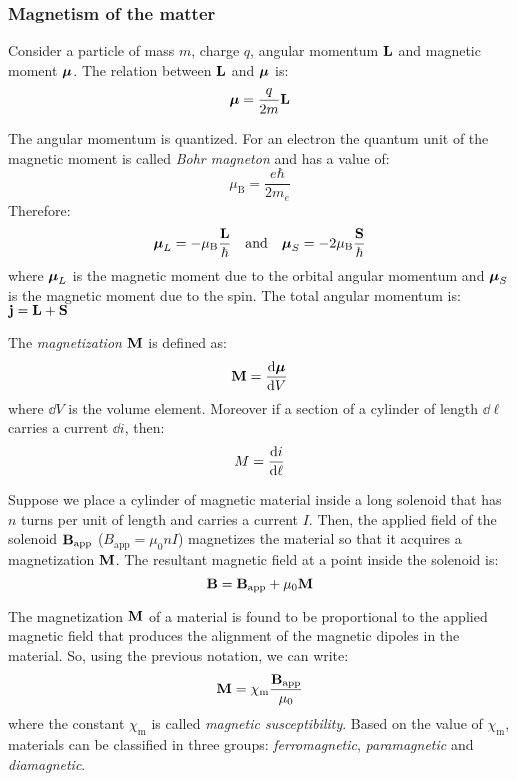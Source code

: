 \documentclass[../../../main.tex]{subfiles}
\begin{document}
\begin{multicols}{2}
  \subsubsection{Magnetism of the matter}
  \begin{prop}
    Consider a particle of mass $m$, charge $q$, angular momentum $\boldsymbol{\mathrm{L}}$ and magnetic moment $\vb*{\mu}$. The relation between $\boldsymbol{\mathrm{L}}$ and $\vb*{\mu}$ is: $$\vb*{\mu}=\frac{q}{2m}\boldsymbol{\mathrm{L}}$$
  \end{prop}
  \begin{prop}
    The angular momentum is quantized. For an electron the quantum unit of the magnetic moment is called \textit{Bohr magneton} and has a value of: $$\mu_\text{B}=\frac{e\hbar}{2m_e}$$ Therefore: $$\vb*{\mu}_L=-\mu_\text{B}\frac{\boldsymbol{\mathrm{L}}}{\hbar}\quad\text{and}\quad\vb*{\mu}_S=-2\mu_\text{B}\frac{\boldsymbol{\mathrm{S}}}{\hbar}$$ where $\vb*{\mu}_L$ is the magnetic moment due to the orbital angular momentum and $\vb*{\mu}_S$ is the magnetic moment due to the spin. The total angular momentum is: $\boldsymbol{\mathrm{j}}=\boldsymbol{\mathrm{L}}+\boldsymbol{\mathrm{S}}$
  \end{prop}
  \begin{definition}
    The \textit{magnetization $\boldsymbol{\mathrm{M}}$} is defined as: $$\boldsymbol{\mathrm{M}}=\dv{\vb*{\mu}}{V}$$ where $\dd V$ is the volume element. Moreover if a section of a cylinder of length $\dd\ell$ carries a current $\dd i$, then: $$M=\dv{i}{\ell}$$
  \end{definition}
  \begin{prop}
    Suppose we place a cylinder of magnetic material inside a long solenoid that has $n$ turns per unit of length and carries a current $I$. Then, the applied field of the solenoid $\boldsymbol{\mathrm{B}}_\text{app}$ ($B_\text{app}=\mu_0nI$) magnetizes the material so that it acquires a magnetization $\boldsymbol{\mathrm{M}}$. The resultant magnetic field at a point inside the solenoid is: $$\boldsymbol{\mathrm{B}}=\boldsymbol{\mathrm{B}}_\text{app}+\mu_0\boldsymbol{\mathrm{M}}$$
  \end{prop}
  \begin{prop}
    The magnetization $\boldsymbol{\mathrm{M}}$ of a material is found to be proportional to the applied magnetic field that produces the alignment of the magnetic dipoles in the material. So, using the previous notation, we can write: $$\boldsymbol{\mathrm{M}}=\chi_\text{m}\frac{\boldsymbol{\mathrm{B}}_\text{app}}{\mu_0}$$ where the constant $\chi_\text{m}$ is called \textit{magnetic susceptibility}. Based on the value of $\chi_\text{m}$, materials can be classified in three groups: \textit{ferromagnetic}, \textit{paramagnetic} and \textit{diamagnetic}.

\end{prop}
\end{multicols}
\end{document}
